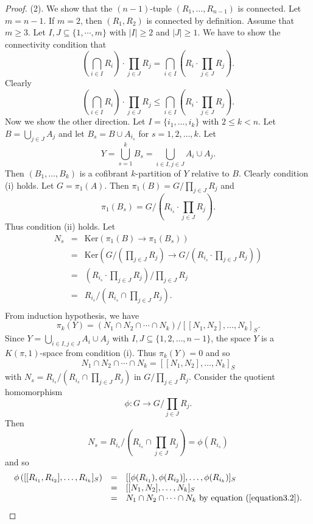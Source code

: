 \documentclass[10pt]{amsart}
\numberwithin{equation}{section}
\begin{document}
\begin{proof}
(2). We show that the $(n-1)$-tuple $(R_1,\ldots,R_{n-1})$ is connected. Let $m=n-1$. If $m=2$, then $(R_1,R_2)$ is connected by definition. Assume that $m\geq 3$. Let $I, J \subseteq \{1,\cdots,m\}$ with $ |I|\geq 2$ and $|J|\geq 1$. We have to show the connectivity condition that
$$
\left(\bigcap_{i\in I} R_i \right)\cdot  \prod_{j\in J}R_j =
\bigcap_{i\in I} \left( R_i\cdot \prod_{j\in J}R_j \right).
$$
Clearly
$$
\left(\bigcap_{i\in I} R_i \right)\cdot \prod_{j\in J}R_j\leq
\bigcap_{i\in I} \left( R_i\cdot \prod_{j\in J}R_j \right).
$$
Now we show the other direction. Let $I=\{i_1,\ldots,i_k\}$ with $2\leq k<n$. Let $B=\bigcup_{j\in J}A_j$ and let $B_s=B\cup A_{i_s}$ for $s=1,2,\ldots,k$. Let
$$
Y=\bigcup_{s=1}^kB_s=\bigcup_{i\in I, j\in J}A_i\cup A_j.
$$
Then $(B_1,\ldots,B_k)$ is a cofibrant $k$-partition of $Y$ relative to $B$. Clearly condition (i) holds. Let $G=\pi_1(A)$. Then $\pi_1(B)=G/\prod_{j\in J}R_j$ and
$$
\pi_1(B_s)=G/(R_{i_s}\cdot\prod_{j\in J}R_j).
$$
Thus condition (ii) holds. Let
$$
\begin{array}{rcl}
N_s&=&{\mathrm{K er}}(\pi_1(B)\to \pi_1(B_s))\\
&=&{\mathrm{K er}}(G/(\prod_{j\in J}R_j)\to G/(R_{i_s}\cdot\prod_{j\in J}R_j))\\
&=&(R_{i_s}\cdot\prod_{j\in J}R_j)/\prod_{j\in J}R_j\\
&=&R_{i_s}/(R_{i_s}\cap \prod_{j\in J}R_j).\\
\end{array}
$$
From induction hypothesis, we have
$$
\pi_k(Y)=(N_1\cap N_2\cap\cdots\cap N_k)/[[N_1,N_2],\ldots,N_k]_S.
$$
Since $
Y=\bigcup_{i\in I, j\in J}A_i\cup A_j$ with $I,J\subseteq\{1,2,\ldots,n-1\}$, the space $Y$ is a $K(\pi,1)$-space from condition (i). Thus $\pi_k(Y)=0$ and so
\begin{equation}\label{equation3.2}
N_1\cap N_2\cap\cdots\cap N_k=[[N_1,N_2],\ldots,N_k]_S
\end{equation}
with $N_s=R_{i_s}/(R_{i_s}\cap \prod_{j\in J}R_j)$ in $G/\prod_{j\in J}R_j$. Consider the quotient homomorphism
$$
\phi\colon G\longrightarrow G/\prod_{j\in J}R_j.
$$
Then
$$
N_s=R_{i_s}/(R_{i_s}\cap \prod_{j\in J}R_j)=\phi(R_{i_s})
$$
and so
$$
\begin{array}{rcl}
\phi\left([[R_{i_1},R_{i_2}],\ldots,R_{i_k}]_S\right)&=&[[\phi(R_{i_1}),\phi(R_{i_2})],\ldots,\phi(R_{i_k})]_S\\
&=&[[N_1,N_2],\ldots,N_k]_S\\
&=&N_1\cap N_2\cap\cdots\cap N_k \textrm{ by equation~(\ref{equation3.2})}.\\

\end{array}$$
\end{proof}
\end{document}
